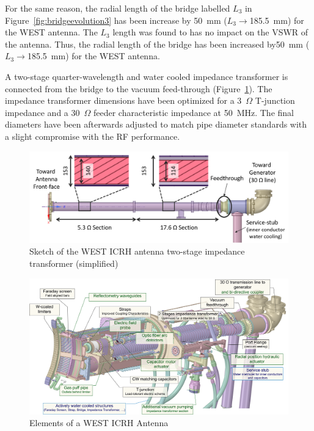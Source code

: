{For the same reason, the radial length of the bridge labelled $L_3$ in Figure~\ref{fig:bridgeevolution3} has been increase by 50~mm ($L_3\to $185.5~mm) for the WEST antenna. The $L_3$ length was found to has no impact on the VSWR of the antenna. Thus, the radial length of the bridge has been increased by50~mm ($L_3\to$185.5~mm) for the WEST antenna.



A two-stage quarter-wavelength and water cooled impedance transformer is connected from the bridge to the vacuum feed-through (Figure~\ref{fig:westicrhimpedancetransformer}). The impedance transformer dimensions have been optimized for a 3~$\si{\Omega}$ T-junction impedance and a 30~$\si{\Omega}$ feeder characteristic impedance at 50~MHz. The final diameters have been afterwards adjusted to match pipe diameter standards with a slight compromise with the RF performance. 

\begin{figure}[h]
	\centering
	\includegraphics[width=1.0\linewidth]{figures/chap3/WEST_ICRH/WEST_ICRH_impedance_transformer}
	\caption{Sketch of the WEST ICRH antenna two-stage impedance transformer (simplified)}
	\label{fig:westicrhimpedancetransformer}
\end{figure}



\begin{figure}
	\centering
	\includegraphics[width=1.0\linewidth]{figures/chap3/WEST_ICRH/WEST_ICRH_antenna_elements}
	\caption{Elements of a WEST ICRH Antenna}
	\label{fig:westicrhantennaelements}
\end{figure}

}
